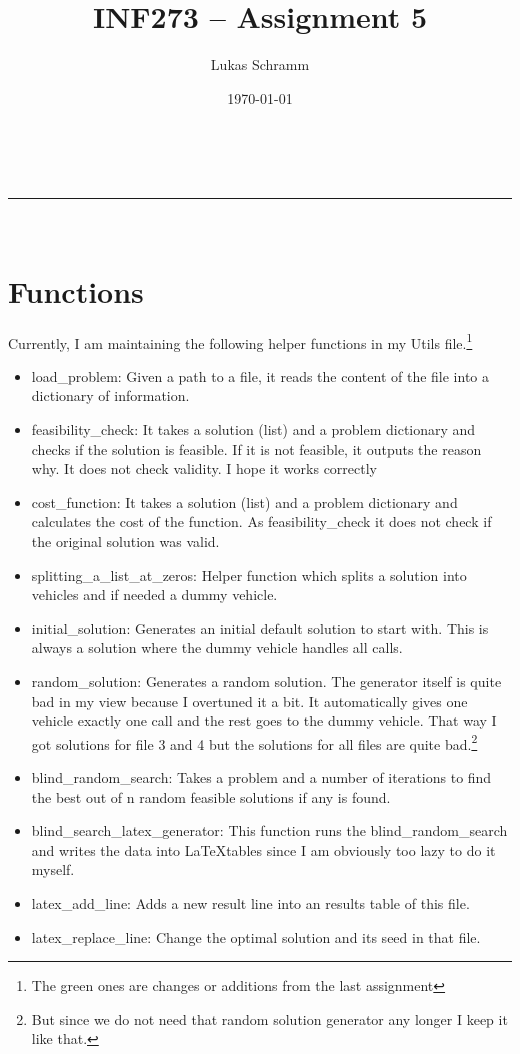 \documentclass[a4paper,11pt]{article}
\makeatletter
\newcommand{\linia}{\rule{\linewidth}{0.5pt}}
\theoremstyle{mytheor}
\renewcommand{\maketitle}{
\begin{center}
\vspace{2ex}
{\huge \textsc{\@title}}
\vspace{1ex}
\\
\linia\\
\@author \hfill \@date
\vspace{4ex}
\end{center}
}
\makeatother
\begin{document}
\title{INF273 – Assignment 5}

\author{Lukas Schramm}

\date{\today}

\maketitle

\section{Functions}
Currently, I am maintaining the following helper functions in my Utils file.\footnote{The green ones are changes or additions from the last assignment}
\begin{itemize}
\item load\_problem: Given a path to a file, it reads the content of the file into a dictionary of information.
\item feasibility\_check: It takes a solution (list) and a problem dictionary and checks if the solution is feasible. If it is not feasible, it outputs the reason why. It does not check validity. I hope it works correctly
\item cost\_function: It takes a solution (list) and a problem dictionary and calculates the cost of the function. As feasibility\_check it does not check if the original solution was valid.
\item splitting\_a\_list\_at\_zeros: Helper function which splits a solution into vehicles and if needed a dummy vehicle.
\item initial\_solution: Generates an initial default solution to start with. This is always a solution where the dummy vehicle handles all calls.

\item random\_solution: Generates a random solution. The generator itself is quite bad in my view because I overtuned it a bit. It automatically gives one vehicle exactly one call and the rest goes to the dummy vehicle. That way I got solutions for file 3 and 4 but the solutions for all files are quite bad.\footnote{But since we do not need that random solution generator any longer I keep it like that.}
\item blind\_random\_search: Takes a problem and a number of iterations to find the best out of n random feasible solutions if any is found.
\item blind\_search\_latex\_generator: This function runs the blind\_random\_search and writes the data into \LaTeX tables since I am obviously too lazy to do it myself.
\item latex\_add\_line: Adds a new result line into an results table of this file.
\item latex\_replace\_line: Change the optimal solution and its seed in that file.


\end{itemize}
\end{document}
